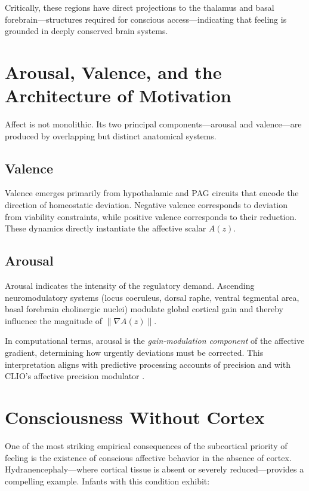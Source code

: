 \documentclass[12pt,oneside]{book}
\theoremstyle{plain}
\theoremstyle{definition}
\let\citep\parencite
\begin{document}
Critically, these regions have direct projections to the thalamus and basal
forebrain—structures required for conscious access—indicating that
feeling is grounded in deeply conserved brain systems.

\section{Arousal, Valence, and the Architecture of Motivation}

Affect is not monolithic.
Its two principal components—arousal and valence—are produced by overlapping
but distinct anatomical systems.

\subsection{Valence}

Valence emerges primarily from hypothalamic and PAG circuits that encode
the direction of homeostatic deviation.
Negative valence corresponds to deviation from viability constraints,
while positive valence corresponds to their reduction.
These dynamics directly instantiate the affective scalar $A(z)$.

\subsection{Arousal}

Arousal indicates the intensity of the regulatory demand.
Ascending neuromodulatory systems (locus coeruleus, dorsal raphe,
ventral tegmental area, basal forebrain cholinergic nuclei) modulate global
cortical gain and thereby influence the magnitude of $\|\nabla A(z)\|$.

In computational terms, arousal is the \emph{gain-modulation component}
of the affective gradient, determining how urgently deviations must be
corrected.
This interpretation aligns with predictive processing accounts of precision
\citep{friston2017active} and with CLIO’s affective precision
modulator \citep{cheng2025cognitive}.

\section{Consciousness Without Cortex}

One of the most striking empirical consequences of the subcortical priority of
feeling is the existence of conscious affective behavior in the absence of
cortex.
Hydranencephaly—where cortical tissue is absent or severely reduced—provides
a compelling example.
Infants with this condition exhibit:
\end{document}
